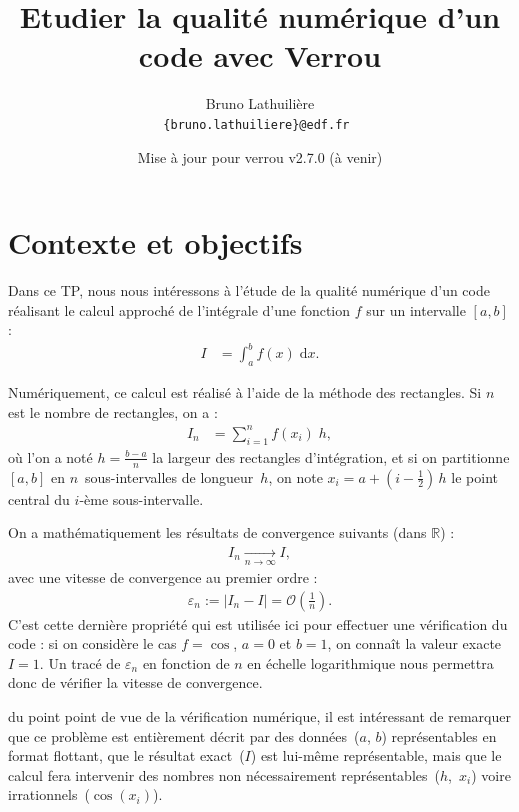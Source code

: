 \documentclass[a4paper]{article}
\title{Etudier la qualité numérique d'un code avec Verrou}
\author{Bruno Lathuilière\\
  \tt \{bruno.lathuiliere\}@edf.fr
}
\date{Mise à jour \cite{tpVerrou} pour verrou v2.7.0 (à venir)}
\newenvironment{info}[1][NB :]{
  \begin{mdframed}[style=info]
    \noindent{\bf #1}
}{
  \end{mdframed}
}
\begin{document}
\maketitle


\section*{Contexte et objectifs}

Dans ce TP, nous nous intéressons à l'étude de la qualité numérique d'un code
réalisant le calcul approché de l'intégrale d'une fonction $f$ sur un intervalle
$[a, b]$ :
\begin{align*}
  I &= \int_{a}^{b} f(x) \; \text{d}x.
\end{align*}

Numériquement, ce calcul est réalisé à l'aide de la méthode des rectangles. Si
$n$ est le nombre de rectangles, on a :
\begin{align*}
  I_n &= \sum_{i=1}^n f(x_i) \; h,
\end{align*}
où l'on a noté $h = \frac{b - a}{n}$ la largeur des rectangles d'intégration, et
si on partitionne $[a, b]$ en $n$~sous-intervalles de longueur~$h$, on note
$x_i = a + (i-\frac{1}{2}) \, h$ le point central du $i$-ème sous-intervalle.

\bigskip

On a mathématiquement les résultats de convergence suivants (dans $\mathbb{R}$) :
\begin{align*}
  I_n \xrightarrow[n \to \infty]{} I,
\end{align*}
avec une vitesse de convergence au premier ordre :
\begin{align*}
  \varepsilon_n := \left\vert I_n - I \right\vert = \mathcal{O}\left(\frac{1}{n}\right).
\end{align*}
C'est cette dernière propriété qui est utilisée ici pour effectuer une vérification
du code : si on considère le cas $f = \cos$, $a = 0$ et $b = 1$, on connaît
la valeur exacte $I=1$. Un tracé de $\varepsilon_n$ en fonction de $n$ en
échelle logarithmique nous permettra donc de vérifier la vitesse de convergence.

\bigskip

\begin{info}[Remarque :]
  du point point de vue de la vérification numérique, il est intéressant de
  remarquer que ce problème est entièrement décrit par des données~($a$, $b$)
  représentables en format flottant, que le résultat exact~($I$) est lui-même
  représentable, mais que le calcul fera intervenir des nombres non
  nécessairement re\-pré\-sen\-tables~\mbox{($h$, $x_i$)} voire
  irrationnels~($\cos(x_i)$).
\end{info}
\end{document}
